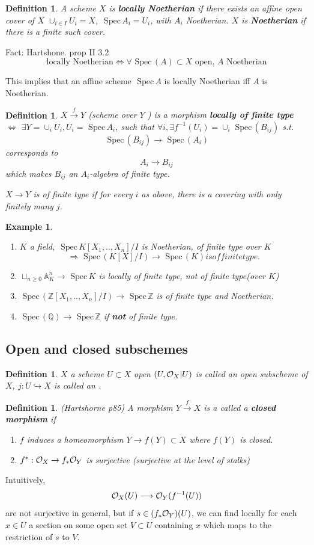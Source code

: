 \documentclass[11pt]{article}
\newtheorem{dfn}[thm]{Definition}
\newtheorem{ex}[thm]{Example}
\newcommand{\spec}{\text{ Spec}\,}
\newcommand{\affn}{\mathbb A}
\newcommand{\intg}{\mathbb Z}
\newcommand{\ratl}{\mathbb Q}
\newcommand{\calo}{{\cal O}}
\newcommand{\rta}{\rightarrow}
\newcommand{\Lrta}{\Longrightarrow}
\newcommand{\lrta}{\longrightarrow}
\newcommand{\Llrta}{\Longleftrightarrow}
\newcommand{\inj}{\hookrightarrow}
\begin{document}
\begin{dfn}
A scheme $X$ is \textbf{locally Noetherian} if there exists an affine open cover of $X$
$\cup_{i\in I} U_i=X$, $\spec A_i=U_i$, with $A_i$ Noetherian. $X$ is \textbf{Noetherian} if there is a  finite such cover.
\end{dfn}
Fact: Hartshone. prop II 3.2
$$
\text{locally Noetherian}\Llrta \forall \spec(A)\subset X \text{ open, } A \text{ Noetherian}
$$

This implies that an affine scheme $\spec A$ is locally Noetherian iff $A$ is Noetherian.

\begin{dfn}
$X\overset{f}{\lrta } Y$ (scheme over $Y$ ) is a morphism \textbf{locally of finite type} $\Llrta$ $\exists Y=\cup_i U_i, U_i=\spec A_i$, such that $\forall i, \exists f^{-1}(U_i)=\cup_i \spec(B_{ij})$ s.t.
$$
\spec(B_{ij})\lrta \spec(A_i)
$$
corresponds to 
$$
A_i\lrta B_{ij}
$$
which makes $B_{ij}$ an $A_i$-algebra of finite type.

$X\lrta Y$ is of finite type if for every $i$ as above, there is a covering with only finitely many $j$.
\end{dfn}
\begin{ex}\ 
\begin{enumerate}[label=(\arabic*)]
\item $K$ a field, $\spec K[X_1,..,X_n]/I$ is Noetherian, of finite type over $K$
$$
\Lrta \spec(K[X]/I)\lrta \spec(K) is of finite type.
$$
\item $\sqcup_{n\geq 0}\affn^n_K\lrta \spec K$ is locally of finite type, not of finite type(over $K$)
\item $\spec (\intg[X_1,..,X_n]/I)\lrta\spec \intg$ is of finite type and Noetherian.
\item $\spec(\ratl)\lrta \spec \intg$ if \textbf{not} of finite type.
\end{enumerate}
\end{ex}
\subsection{Open and closed subschemes}
\begin{dfn}
$X$ a scheme $U\subset X$ open $(U,\calo_X|U)$ is called an open subscheme of $X$, $j:U\inj  X$ is called an .
\end{dfn}
\begin{dfn}
(Hartshorne p85) A morphism $Y\overset{f}{\lrta}X$ is a called a \textbf{closed morphism} if 
\begin{enumerate}[label=(\arabic*)]
\item $f$ induces a homeomorphism $Y\lrta f(Y)\subset X$ where $f(Y)$  is closed.
\item
$f^*:\calo_X\rta f_*\calo_Y$ is surjective (surjective at the level of stalks)
\end{enumerate}
\end{dfn}
Intuitively,
$$
\calo_X(U)\lrta \calo_Y(f^{-1}(U))
$$
are not surjective  in general, but  if $s\in(f_*\calo_Y)(U)$, we can find locally  for each $x\in U$ a section  on some open set $V\subset U$ containing $x$ which maps to the restriction of $s$ to $V$.
\end{document}
